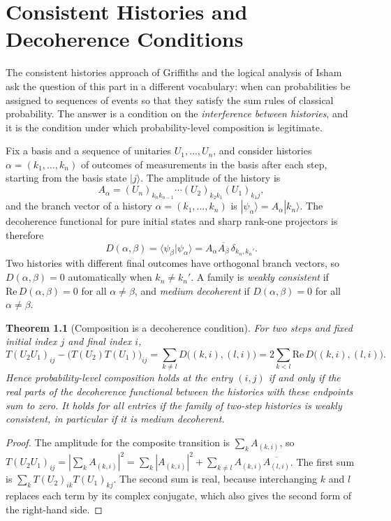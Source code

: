 \documentclass[11pt,oneside]{book}
\newtheorem{theorem}{Theorem}[chapter]
\theoremstyle{definition}
\theoremstyle{remark}
\begin{document}
\chapter{Consistent Histories and Decoherence Conditions}\label{ch:histories}

The consistent histories approach of Griffiths \cite{griffiths1984} and the logical analysis of Isham \cite{isham1994} ask the question of this part in a different vocabulary: when can probabilities be assigned to sequences of events so that they satisfy the sum rules of classical probability. The answer is a condition on the \emph{interference between histories}, and it is the condition under which probability-level composition is legitimate.

Fix a basis and a sequence of unitaries $U_1,\dots,U_n$, and consider histories $\alpha=(k_1,\dots,k_n)$ of outcomes of measurements in the basis after each step, starting from the basis state $|j\rangle$. The amplitude of the history is
\[
A_\alpha=(U_n)_{k_nk_{n-1}}\cdots(U_2)_{k_2k_1}(U_1)_{k_1j},
\]
and the branch vector of a history $\alpha=(k_1,\dots,k_n)$ is $|\psi_\alpha\rangle=A_\alpha|k_n\rangle$. The decoherence functional for pure initial states and sharp rank-one projectors is therefore
\[
D(\alpha,\beta)=\langle\psi_\beta|\psi_\alpha\rangle=A_\alpha\overline{A_\beta}\,\delta_{k_n,k_n'} .
\]
Two histories with different final outcomes have orthogonal branch vectors, so $D(\alpha,\beta)=0$ automatically when $k_n\neq k_n'$. A family is \emph{weakly consistent} if $\mathrm{Re}\,D(\alpha,\beta)=0$ for all $\alpha\neq\beta$, and \emph{medium decoherent} if $D(\alpha,\beta)=0$ for all $\alpha\neq\beta$.

\begin{theorem}[Composition is a decoherence condition]\label{thm:consistent}
For two steps and fixed initial index $j$ and final index $i$,
\[
T(U_2U_1)_{ij}-\bigl(T(U_2)T(U_1)\bigr)_{ij}=\sum_{k\neq l}D\bigl((k,i),(l,i)\bigr)=2\sum_{k<l}\mathrm{Re}\,D\bigl((k,i),(l,i)\bigr).
\]
Hence probability-level composition holds at the entry $(i,j)$ if and only if the real parts of the decoherence functional between the histories with these endpoints sum to zero. It holds for all entries if the family of two-step histories is weakly consistent, in particular if it is medium decoherent.
\end{theorem}

\begin{proof}
The amplitude for the composite transition is $\sum_kA_{(k,i)}$, so $T(U_2U_1)_{ij}=|\sum_kA_{(k,i)}|^2=\sum_k|A_{(k,i)}|^2+\sum_{k\neq l}A_{(k,i)}\overline{A_{(l,i)}}$. The first sum is $\sum_kT(U_2)_{ik}T(U_1)_{kj}$. The second sum is real, because interchanging $k$ and $l$ replaces each term by its complex conjugate, which also gives the second form of the right-hand side.
\end{proof}
\end{document}
